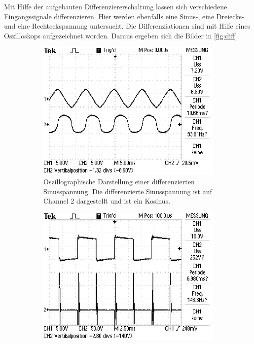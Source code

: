 Mit Hilfe der aufgebauten Differenziererschaltung lassen sich verschiedene Eingangssignale 
differenzieren. 
Hier werden ebenfalls eine Sinus-, eine Dreiecks- und eine Rechteckspannung 
untersucht.
Die Differenziationen sind mit Hilfe eines Oszilloskops aufgezeichnet worden.
Daraus ergeben sich die Bilder in \autoref{fig:diff}.
\begin{figure}
    \centering
    \begin{subfigure}[b]{0.45\textwidth}
        \centering
        \includegraphics[width=\textwidth]{data_of_others_cuz_ours_suck/diff/diff_sin.JPG}
        \caption{Oszillographische Darstellung einer differenzierten Sinusspannung.
        Die differenzierte Sinusspannung ist auf Channel 2 dargestellt und ist ein Kosinus.\cite{int_picture}}
        \label{fig:diff_sin}
    \end{subfigure}
    \hfill
    \begin{subfigure}[b]{0.45\textwidth}
        \centering
        \includegraphics[width=\textwidth]{data_of_others_cuz_ours_suck/diff/diff_recht.JPG}

\end{subfigure}
\end{figure}

